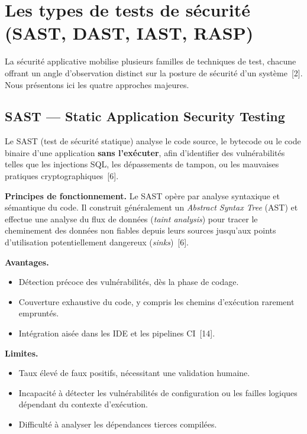 \section{Les types de tests de sécurité (SAST, DAST, IAST, RASP)}
\label{sec:tests}

La sécurité applicative mobilise plusieurs familles de techniques de test,
chacune offrant un angle d'observation distinct sur la posture de sécurité d'un
système~[2]. Nous présentons ici les quatre approches majeures.

\subsection{SAST --- Static Application Security Testing}

Le SAST (test de sécurité statique) analyse le code source, le bytecode ou le
code binaire d'une application \textbf{sans l'exécuter}, afin d'identifier des
vulnérabilités telles que les injections SQL, les dépassements de tampon, ou les
mauvaises pratiques cryptographiques~[6].

\textbf{Principes de fonctionnement.} Le SAST opère par analyse syntaxique et
sémantique du code. Il construit généralement un \emph{Abstract Syntax Tree}
(AST) et effectue une analyse du flux de données (\emph{taint analysis}) pour
tracer le cheminement des données non fiables depuis leurs sources jusqu'aux
points d'utilisation potentiellement dangereux (\emph{sinks})~[6].

\textbf{Avantages.}
\begin{itemize}[leftmargin=*, topsep=2pt, itemsep=1pt]
  \item Détection précoce des vulnérabilités, dès la phase de codage.
  \item Couverture exhaustive du code, y compris les chemins d'exécution
    rarement empruntés.
  \item Intégration aisée dans les IDE et les pipelines CI~[14].
\end{itemize}

\textbf{Limites.}
\begin{itemize}[leftmargin=*, topsep=2pt, itemsep=1pt]
  \item Taux élevé de faux positifs, nécessitant une validation humaine.
  \item Incapacité à détecter les vulnérabilités de configuration ou les
    failles logiques dépendant du contexte d'exécution.
  \item Difficulté à analyser les dépendances tierces compilées.
\end{itemize}


